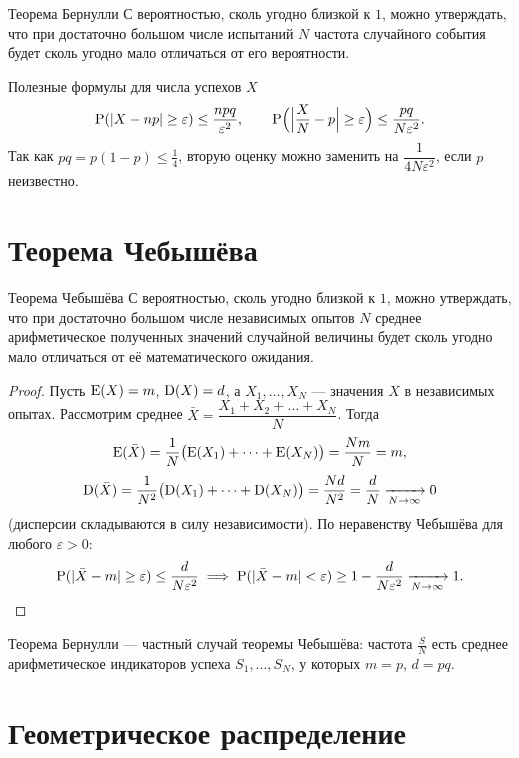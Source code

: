 \documentclass[11pt,a4paper]{article}
\begin{document}
\begin{kob}{Теорема Бернулли}
С вероятностью, сколь угодно близкой к $1$, можно утверждать, что при достаточно большом числе испытаний $N$
частота случайного события будет сколь угодно мало отличаться от его вероятности.
\end{kob}

\begin{fbx}{Полезные формулы для числа успехов $X$}
\[
\P(|X-np|\ge\varepsilon)\le\frac{npq}{\varepsilon^2},\qquad
\P\Bigl(\Bigl|\frac XN-p\Bigr|\ge\varepsilon\Bigr)\le\frac{pq}{N\varepsilon^2}.
\]
Так как $pq=p(1-p)\le\frac14$, вторую оценку можно заменить на $\dfrac{1}{4N\varepsilon^2}$, если $p$ неизвестно.
\end{fbx}

\section{Теорема Чебышёва}

\begin{kob}{Теорема Чебышёва}
С вероятностью, сколь угодно близкой к $1$, можно утверждать, что при достаточно большом числе независимых опытов $N$
среднее арифметическое полученных значений случайной величины будет сколь угодно мало отличаться от её математического ожидания.
\end{kob}

\begin{proof}
Пусть $\E(X)=m$, $\D(X)=d$, а $X_1,\dots,X_N$ — значения $X$ в независимых опытах.
Рассмотрим среднее $\bar X=\dfrac{X_1+X_2+\dots+X_N}{N}$. Тогда
\[
\E(\bar X)=\frac1N\bigl(\E(X_1)+\dots+\E(X_N)\bigr)=\frac{Nm}{N}=m,
\]
\[
\D(\bar X)=\frac1{N^2}\bigl(\D(X_1)+\dots+\D(X_N)\bigr)=\frac{Nd}{N^2}=\frac dN\xrightarrow[N\to\infty]{}0
\]
(дисперсии складываются в силу независимости). По неравенству Чебышёва для любого $\varepsilon>0$:
\[
\P(|\bar X-m|\ge\varepsilon)\le\frac{d}{N\varepsilon^2}\;\Longrightarrow\;
\P(|\bar X-m|<\varepsilon)\ge1-\frac{d}{N\varepsilon^2}\xrightarrow[N\to\infty]{}1.\qedhere
\]
\end{proof}

\begin{zam}
Теорема Бернулли — частный случай теоремы Чебышёва: частота $\frac SN$ есть среднее арифметическое индикаторов
успеха $S_1,\dots,S_N$, у которых $m=p$, $d=pq$.
\end{zam}

\section{Геометрическое распределение}
\end{document}
